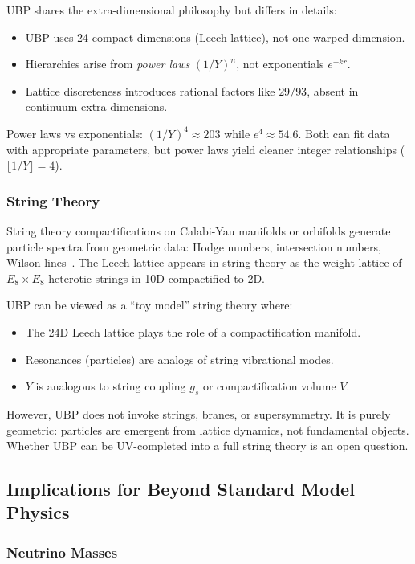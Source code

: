 \documentclass[11pt,a4paper]{article}
\begin{document}
UBP shares the extra-dimensional philosophy but differs in details:
\begin{itemize}
\item UBP uses 24 compact dimensions (Leech lattice), not one warped dimension.
\item Hierarchies arise from \emph{power laws} $(1/Y)^n$, not exponentials $e^{-kr}$.
\item Lattice discreteness introduces rational factors like $29/93$, absent in continuum extra dimensions.
\end{itemize}

Power laws vs exponentials: $(1/Y)^4 \approx 203$ while $e^4 \approx 54.6$. Both can fit data with appropriate parameters, but power laws yield cleaner integer relationships ($\lfloor 1/Y \rfloor = 4$).

\subsubsection{String Theory}

String theory compactifications on Calabi-Yau manifolds or orbifolds generate particle spectra from geometric data: Hodge numbers, intersection numbers, Wilson lines~\cite{ref003}. The Leech lattice appears in string theory as the weight lattice of $E_8 \times E_8$ heterotic strings in 10D compactified to 2D.

UBP can be viewed as a ``toy model'' string theory where:
\begin{itemize}
\item The 24D Leech lattice plays the role of a compactification manifold.
\item Resonances (particles) are analogs of string vibrational modes.
\item $Y$ is analogous to string coupling $g_s$ or compactification volume $V$.
\end{itemize}

However, UBP does not invoke strings, branes, or supersymmetry. It is purely geometric: particles are emergent from lattice dynamics, not fundamental objects. Whether UBP can be UV-completed into a full string theory is an open question.

\subsection{Implications for Beyond Standard Model Physics}

\subsubsection{Neutrino Masses}
\end{document}

